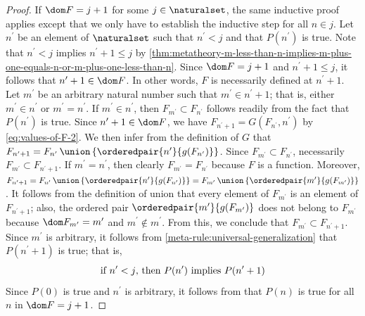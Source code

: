 \begin{proof}
    \vspace{0.3cm}
    \noindent
    If \( \dom F = j + 1 \) for some \( j \in \naturalset \), the same inductive proof applies except that we only have to establish the inductive step for all \( n \in j \).
    Let \( n^{\prime} \) be an element of \( \naturalset \) such that \( n^{\prime} < j \) and that \( P(n^{\prime}) \) is true.
    Note that \( n^{\prime} < j \) implies \( n^{\prime} + 1 \leq j \) by
    \cref{thm:metatheory-m-less-than-n-implies-m-plus-one-equals-n-or-m-plus-one-less-than-n}.
    Since \( \dom F = j + 1 \) and \( n^{\prime} + 1 \leq j \), it follows that \( n^{\prime} + 1 \in \dom F \).
    In other words, \( F \) is necessarily defined at \( n^{\prime} + 1 \).
    Let \( m^{\prime} \) be an arbitrary natural number such that \( m^{\prime} \in n^{\prime} + 1 \); that is, either \( m^{\prime} \in n^{\prime} \)
    or \( m^{\prime} = n^{\prime} \).
    If \( m^{\prime} \in n^{\prime} \), then \( F_{m^{\prime}} \subset F_{n^{\prime}} \) follows readily from the fact that \( P(n^{\prime}) \) is true.
    Since \( n^{\prime} + 1 \in \dom F \), we have \( F_{n^{\prime} + 1} = G(F_{n^{\prime}}, n^{\prime}) \) by \eqref{eq:values-of-F-2}.
    We then infer from the definition of \( G \) that \( F_{n^{\prime} + 1} = F_{n^{\prime}} \,{\union}\, \mleft\{ \orderedpair{n^{\prime}}{g(F_{n^{\prime}})} \mright\} \).
    Since \( F_{m^{\prime}} \subset F_{n^{\prime}} \), necessarily \( F_{m^{\prime}} \subset F_{n^{\prime} + 1} \).
    If \( m^{\prime} = n^{\prime} \), then clearly \( F_{m^{\prime}} = F_{n^{\prime}} \) because \( F \) is a function.
    Moreover, \( F_{n^{\prime} + 1} = F_{n^{\prime}} \,{\union}\, \mleft\{ \orderedpair{n^{\prime}}{g(F_{n^{\prime}})} \mright\}
    = F_{m^{\prime}} \,{\union}\, \mleft\{ \orderedpair{m^{\prime}}{g(F_{m^{\prime}})} \mright\}\).
    It follows from the definition of union that every element of \( F_{m^{\prime}} \) is an element of \( F_{n^{\prime} + 1} \);
    also, the ordered pair \( \orderedpair{m^{\prime}}{g(F_{m^{\prime}})} \) does not belong to \( F_{m^{\prime}} \) because
    \( \dom F_{m^{\prime}} = m^{\prime} \) and \( m^{\prime} \notin m^{\prime} \).
    From this, we conclude that \( F_{m^{\prime}} \subset F_{n^{\prime} + 1} \).
    Since \( m^{\prime} \) is arbitrary, it follows from \cref{meta-rule:universal-generalization} that \( P(n^{\prime} + 1) \) is true; that is,
    \begin{equation*}
        \text{if \( n^{\prime} < j \), then \( P(n^{\prime}) \) implies \( P(n^{\prime} + 1) \)}
    \end{equation*}
    Since \( P(0) \) is true and \( n^{\prime} \) is arbitrary, it follows from  that
    \( P(n) \) is true for all \( n \) in \( \dom F = j + 1 \).


\end{proof}

